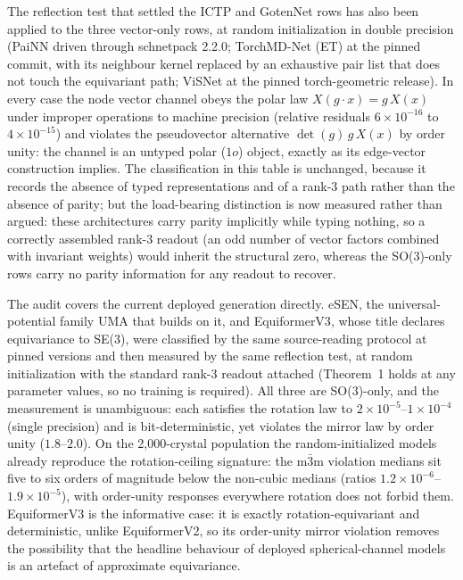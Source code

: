 The reflection test that settled the ICTP and GotenNet rows has also been applied to the three vector-only rows, at random initialization in double precision (PaiNN driven through schnetpack 2.2.0; TorchMD-Net (ET) at the pinned commit, with its neighbour kernel replaced by an exhaustive pair list that does not touch the equivariant path; ViSNet at the pinned torch-geometric release). In every case the node vector channel obeys the polar law $X(g\!\cdot\!x) = g\,X(x)$ under improper operations to machine precision (relative residuals $6\times10^{-16}$ to $4\times10^{-15}$) and violates the pseudovector alternative $\det(g)\,g\,X(x)$ by order unity: the channel is an untyped polar ($1o$) object, exactly as its edge-vector construction implies. The classification in this table is unchanged, because it records the absence of typed representations and of a rank-3 path rather than the absence of parity; but the load-bearing distinction is now measured rather than argued: these architectures carry parity implicitly while typing nothing, so a correctly assembled rank-3 readout (an odd number of vector factors combined with invariant weights) would inherit the structural zero, whereas the SO(3)-only rows carry no parity information for any readout to recover.

The audit covers the current deployed generation directly. eSEN\cite{fu2025esen}, the universal-potential family UMA\cite{wood2025uma} that builds on it, and EquiformerV3\cite{equiformerv3}, whose title declares equivariance to SE(3), were classified by the same source-reading protocol at pinned versions and then measured by the same reflection test, at random initialization with the standard rank-3 readout attached (Theorem~1 holds at any parameter values, so no training is required). All three are SO(3)-only, and the measurement is unambiguous: each satisfies the rotation law to $2\times10^{-5}$--$1\times10^{-4}$ (single precision) and is bit-deterministic, yet violates the mirror law by order unity ($1.8$--$2.0$). On the 2,000-crystal population the random-initialized models already reproduce the rotation-ceiling signature: the m$\bar 3$m violation medians sit five to six orders of magnitude below the non-cubic medians (ratios $1.2\times10^{-6}$--$1.9\times10^{-5}$), with order-unity responses everywhere rotation does not forbid them. EquiformerV3 is the informative case: it is exactly rotation-equivariant and deterministic, unlike EquiformerV2, so its order-unity mirror violation removes the possibility that the headline behaviour of deployed spherical-channel models is an artefact of approximate equivariance.

